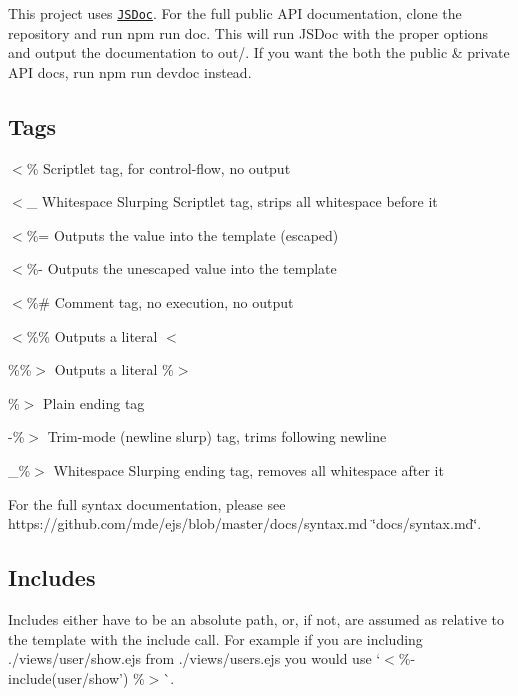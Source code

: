 This project uses \href{http://usejsdoc.org/}{\tt J\+S\+Doc}. For the full public A\+PI documentation, clone the repository and run {\ttfamily npm run doc}. This will run J\+S\+Doc with the proper options and output the documentation to {\ttfamily out/}. If you want the both the public \& private A\+PI docs, run {\ttfamily npm run devdoc} instead.

\subsection*{Tags}


\begin{DoxyItemize}
\item {\ttfamily $<$\%} \textquotesingle{}Scriptlet\textquotesingle{} tag, for control-\/flow, no output
\item {\ttfamily $<$\+\_\+} \textquotesingle{}Whitespace Slurping\textquotesingle{} Scriptlet tag, strips all whitespace before it
\item {\ttfamily $<$\%=} Outputs the value into the template (escaped)
\item {\ttfamily $<$\%-\/} Outputs the unescaped value into the template
\item {\ttfamily $<$\%\#} Comment tag, no execution, no output
\item {\ttfamily $<$\%\%} Outputs a literal \textquotesingle{}$<$\textquotesingle{}
\item {\ttfamily \%\%$>$} Outputs a literal \textquotesingle{}\%$>$\textquotesingle{}
\item {\ttfamily \%$>$} Plain ending tag
\item {\ttfamily -\/\%$>$} Trim-\/mode (\textquotesingle{}newline slurp\textquotesingle{}) tag, trims following newline
\item {\ttfamily \+\_\+\%$>$} \textquotesingle{}Whitespace Slurping\textquotesingle{} ending tag, removes all whitespace after it
\end{DoxyItemize}

For the full syntax documentation, please see https\+://github.com/mde/ejs/blob/master/docs/syntax.\+md \char`\"{}docs/syntax.\+md\char`\"{}.

\subsection*{Includes}

Includes either have to be an absolute path, or, if not, are assumed as relative to the template with the {\ttfamily include} call. For example if you are including {\ttfamily ./views/user/show.ejs} from {\ttfamily ./views/users.ejs} you would use `$<$\%-\/ include(\textquotesingle{}user/show') \%$>$\`{}.

